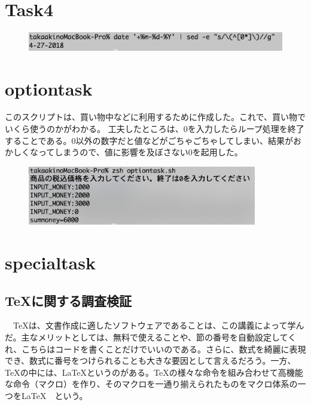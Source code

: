 \documentclass[a4paper,11pt,titlepage]{jarticle}
\begin{document}
\section{Task4}
\begin{figure}[htbp]
	\centering
	\includegraphics[width=120mm]{task3_4.png}
	\label{task3_4}\\
\end{figure}

\section{optiontask}
このスクリプトは、買い物中などに利用するために作成した。これで、買い物でいくら使うのかがわかる。
工夫したところは、0を入力したらループ処理を終了することである。0以外の数字だと値などがごちゃごちゃしてしまい、結果がおかしくなってしまうので、値に影響を及ぼさない0を起用した。
 \begin{figure}[htbp]
	\centering
	\includegraphics[width=100mm]{task3_5.png}
	\label{task3_5}\\
\end{figure}

\section{specialtask}
\subsection{\TeX に関する調査検証}
　\TeX は、文書作成に適したソフトウェアであることは、この講義によって学んだ。主なメリットとしては、無料で使えることや、節の番号を自動設定してくれ、こちらはコードを書くことだけでいいのである。さらに、数式を綺麗に表現でき、数式に番号をつけられることも大きな要因として言えるだろう。一方、\TeX の中には、\LaTeX というのがある。\TeX の様々な命令を組み合わせて高機能な命令（マクロ）を作り、そのマクロを一通り揃えられたものをマクロ体系の一つを\LaTeX　という。　　
\end{document}

